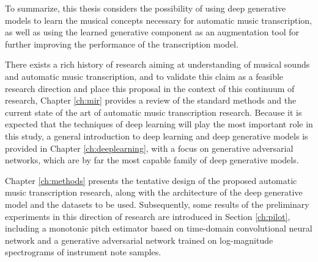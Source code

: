 To summarize, this thesis considers the possibility of using deep generative models to learn the musical concepts necessary for automatic music transcription, as well as using the learned generative component as an augmentation tool for further improving the performance of the transcription model.

There exists a rich history of research aiming at understanding of musical sounds and automatic music transcription, and to validate this claim as a feasible research direction and place this proposal in the context of this continuum of research, Chapter \ref{ch:mir} provides a review of the standard methods and the current state of the art of automatic music transcription research.
Because it is expected that the techniques of deep learning will play the most important role in this study, a general introduction to deep learning and deep generative models is provided in Chapter \ref{ch:deeplearning}, with a focus on generative adversarial networks, which are by far the most capable family of deep generative models.


Chapter \ref{ch:methods} presents the tentative design of the proposed automatic music transcription research, along with the architecture of the deep generative model and the datasets to be used.
Subsequently, some results of the preliminary experiments in this direction of research are introduced in Section \ref{ch:pilot}, including a monotonic pitch estimator based on time-domain convolutional neural network and a generative adversarial network trained on log-magnitude spectrograms of instrument note samples.